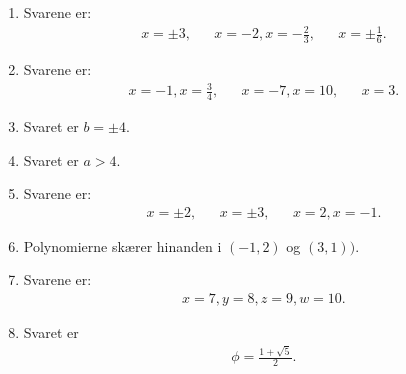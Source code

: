 \begin{enumerate}
\item Svarene er: 
\begin{align*}
x=\pm 3, && x=-2,x=-\frac{2}{3},&& x=\pm \frac{1}{6}.
\end{align*}

\item Svarene er:
\begin{align*}
 x=-1,x=\frac{3}{4},&& x=-7,x=10,&&x=3.
\end{align*}

\item Svaret er $b=\pm 4$.

\item Svaret er $a>4$.

\item Svarene er:
\begin{align*}
x=\pm 2,&& x=\pm 3,&& x=2,x=-1.
\end{align*}



\item \label{it:2poly} Polynomierne skærer hinanden i $(-1,2)$ og $(3,1))$.

\item Svarene er:
\begin{align*}
x=7,y=8,z=9,w=10.
\end{align*}

\item \label{it:phi} Svaret er
\begin{align*}
\phi=\frac{1+\sqrt{5}}{2}.
\end{align*}

%


\end{enumerate}

